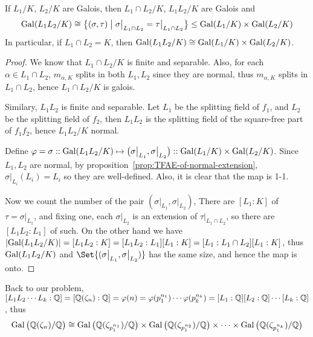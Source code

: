 \begin{lemma}
  If $L_1 / K$, $L_2 / K$ are Galois, then $L_1 \cap L_2 / K$, $L_1 L_2 / K$ are Galois and
  \[ \operatorname{Gal}( L_1 L_2 / K) \cong \big\{ (\sigma, \tau) \bigm| \sigma\big|_{L_1 \cap L_2} = \tau\big|_{L_1 \cap L_2} \big\}
    \leq \operatorname{Gal}(L_1 / K) \times \operatorname{Gal}(L_2 / K) \]
  In particular, if $L_1 \cap L_2 = K$, then $\operatorname{Gal}(L_1 L_2 / K) \cong \operatorname{Gal}(L_1 / K) \times \operatorname{Gal}(L_2 / K)$.

  \begin{proof}
    We know that $L_1 \cap L_2 / K$ is finite and separable. Also, for each $\alpha \in L_1 \cap L_2$,
    $m_{\alpha, K}$ splits in both $L_1, L_2$ since they are normal, thus $m_{\alpha, K}$ splits
    in $L_1 \cap L_2$, hence $L_1 \cap L_2 / K$ is galois.

    Similary, $L_1 L_2$ is finite and separable. Let $L_1$ be the splitting field of $f_1$,
    and $L_2$ be the splitting field of $f_2$, then $L_1 L_2$ is the splitting field
    of the square-free part of $f_1 f_2$, hence $L_1 L_2 / K$ normal.

    Define $\varphi = \sigma :: \operatorname{Gal}(L_1 L_2 / K) \mapsto \big( \sigma \big|_{L_1}, \sigma \big|_{L_2} \big)
    :: \operatorname{Gal}(L_1 / K) \times \operatorname{Gal}(L_2 / K)$. Since $L_1, L_2$ are normal,
    by proposition~\ref{prop:TFAE-of-normal-extension}, $\sigma \big|_{L_i}(L_i) = L_i$ so they are well-defined.
    Also, it is clear that the map is 1-1.

    Now we count the number of the pair $(\sigma \big|_{L_1}, \sigma \big|_{L_2})$,
    There are $[L_1: K]$ of $\tau = \sigma \big|_{L_1}$, and fixing one, each $\sigma \big|_{L_2}$
    is an extension of $\tau \big|_{L_1 \cap L_2}$, so there are $[L_1 L_2 : L_1]$ of such.
    On the other hand we have $\lvert\operatorname{Gal}(L_1 L_2 / K)\rvert = [L_1 L_2 : K] = [L_1 L_2 : L_1]
    [L_1 : K] = [L_1 : L_1 \cap L_2] [L_1 : K]$, thus $\operatorname{Gal}(L_1 L_2 / K)$ and
    $\Set{(\sigma \big|_{L_1}, \sigma \big|_{L_2})}$ has the same size, and hence the
    map is onto.
  \end{proof}
\end{lemma}

Back to our problem, $[L_1 L_2 \cdots L_k: \mathbb{Q}] = [\mathbb{Q}(\zeta_n): \mathbb{Q}] = \varphi(n) = \varphi(p_1^{n_1})
\cdots \varphi(p_k^{n_k}) = [L_1 : \mathbb{Q}] [L_2 : \mathbb{Q}] \cdots [L_k : \mathbb{Q}]$, thus
\[ \operatorname{Gal}\big( \mathbb{Q}(\zeta_n) / \mathbb{Q} \big) \cong
  \operatorname{Gal}\big( \mathbb{Q}(\zeta_{p_1^{n_1}}) / \mathbb{Q} \big) \times
  \operatorname{Gal}\big( \mathbb{Q}(\zeta_{p_1^{n_2}}) / \mathbb{Q} \big) \times \cdots \times
  \operatorname{Gal}\big( \mathbb{Q}(\zeta_{p_1^{n_k}}) / \mathbb{Q} \big) \]


